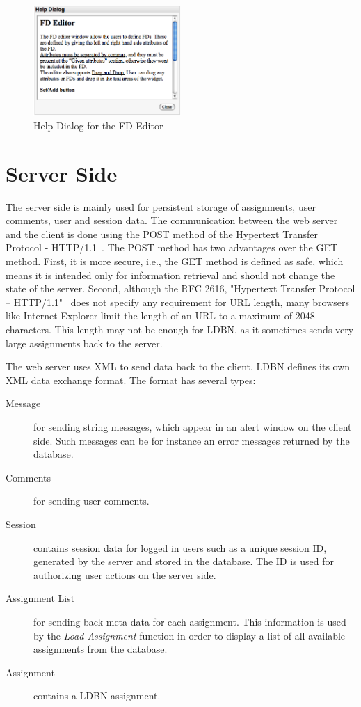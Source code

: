 \begin{figure}[h]
	\begin{center}
		\includegraphics[width=0.5\textwidth]{./img/screen-help.png}
		\caption{Help Dialog for the FD Editor}
		\label{fig:screen-help}
	\end{center}
\end{figure}


\section{Server Side}
The server side is mainly used for persistent storage of assignments, user comments,
user and session data. The communication between the web server and the client
is done using the POST method of the Hypertext Transfer Protocol - HTTP/1.1~\cite{w6}.
The POST method has two advantages over the GET method. First, it is more secure, i.e., 
the GET method is defined as safe, which means it is intended only for information 
retrieval and should not change the state of the server. Second, although the
RFC 2616, "Hypertext Transfer Protocol -- HTTP/1.1"~\cite{w6} does not specify
any requirement for URL length, many browsers like Internet Explorer limit
the length of an URL to a maximum of 2048 characters. This length may not be 
enough for LDBN, as it sometimes sends very large assignments back to the server.  

The web server uses XML to send data back to the client. LDBN defines its own XML data
exchange format. The format has several types:

\begin{description}
	\item[Message] for sending string messages, which appear in an alert window on 
	the client side. Such messages can be for instance an error messages returned
	by the database. 
	\item[Comments] for sending user comments. 
	\item[Session] contains session data for logged in users such as a unique session 
	ID, generated by the server and stored in the database. The ID is used for
	authorizing user actions on the server side.
	\item[Assignment List] for sending back meta data for each assignment. This
	information is used by the \textit{Load Assignment} function in order 
	to display a list of all available assignments from the database.
	\item[Assignment] contains a LDBN assignment. 
\end{description}  

